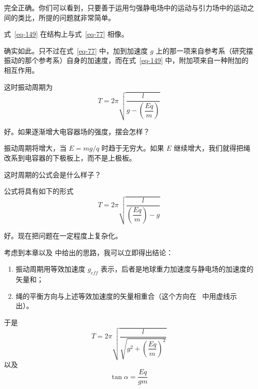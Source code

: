 \begin{dialogue}
\tchr 完全正确。你们可以看到，只要善于运用匀强静电场中的运动与引力场中的运动之间的类比，所提的问题就非常简单。

\stda 式~\eqref{eq-149} 在结构上与式~\eqref{eq-77} 相像。

\tchr 确实如此。只不过在式~\eqref{eq-77} 中，加到加速度 $g$ 上的那一项来自参考系（研究摆振动的那个参考系）自身的加速度，而在式~\eqref{eq-149} 中，附加项来自一种附加的相互作用。


\stda 这时振动周期为
\begin{equation}%
T = 2 \pi \sqrt{\dfrac{l}{ g- \left(\dfrac{Eq}{m} \right)}}
\label{eq-150}
\end{equation}

\tchr 好。如果逐渐增大电容器场的强度，摆会怎样？

\stda 振动周期将增大，当 $E=mg/q$ 时趋于无穷大。如果 $E$ 继续增大，我们就得把绳改系到电容器的下极板上，而不是上极板。

\tchr 这时周期的公式会是什么样子？

\stda 公式将具有如下的形式
\begin{equation}%
T = 2 \pi \sqrt{\dfrac{l}{ \left(\dfrac{Eq}{m} \right) - g}}
\label{eq-151}
\end{equation}

\tchr 好。现在把问题在一定程度上复杂化。

\stdb 考虑到本章以及 中给出的思路，我可以立即得出结论：
\begin{enumerate}[label=(\arabic*)]
\item 振动周期用等效加速度 $g_{e\!f\!\!f}$ 表示，后者是地球重力加速度与静电场的加速度的矢量和；
\item 绳的平衡方向与上述等效加速度的矢量相重合（这个方向在~ 中用虚线示出）。
\end{enumerate}
于是
\begin{equation}%
T = 2 \pi \sqrt{ \dfrac{l}{\sqrt{ g^{2}+ \left(\dfrac{Eq}{m} \right)^{2}}}}
\label{eq-152}
\end{equation}
以及
\begin{equation}%
\tan \alpha = \dfrac{Eq}{gm}
\label{eq-153}
\end{equation}


\end{dialogue}
